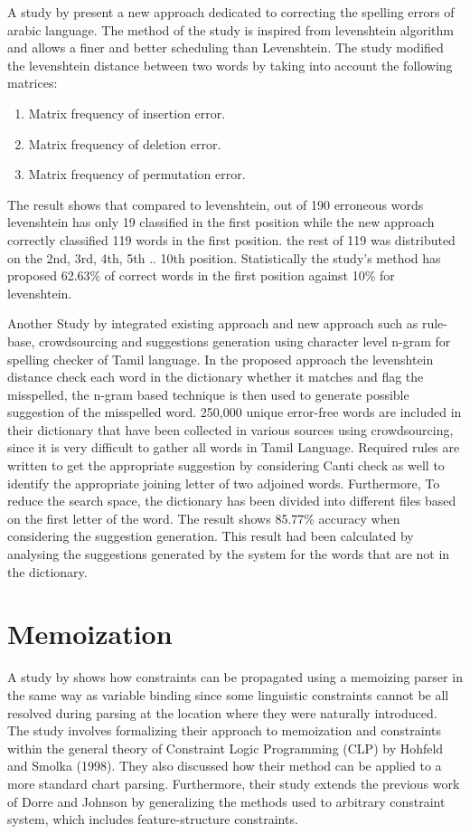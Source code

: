 \documentclass[12pt]{book}
\begin{document}
A study by \cite{hicham2012introduction} present a new approach dedicated to correcting the spelling errors of arabic language. The method of the study is inspired from levenshtein algorithm and allows a finer and better scheduling than Levenshtein. The study modified the levenshtein distance between two words by taking into account the following matrices: 

\begin{enumerate}
	\item Matrix frequency of insertion error.
	\item Matrix frequency of deletion error.
	\item Matrix frequency of permutation error.
\end{enumerate}

The result shows that compared to levenshtein, out of 190 erroneous words levenshtein  has only 19 classified in the first position while the new approach correctly classified 119 words in the first position. the rest of 119 was distributed on the 2nd, 3rd, 4th, 5th .. 10th position. Statistically the study’s method has proposed 62.63\% of correct words  in the first position against 10\% for levenshtein. 

Another Study by \cite{sarveswaran2015hierarchical} integrated existing approach and new approach such as rule-base, crowdsourcing and suggestions generation using character level n-gram for spelling checker of Tamil language. In the proposed approach the levenshtein distance check each word in the dictionary whether it matches and flag the misspelled, the n-gram based technique is then used to generate possible suggestion of the misspelled word.  250,000 unique error-free words  are included in their dictionary that have been collected in various sources using crowdsourcing, since it is very difficult to gather all words in Tamil Language. Required rules are written to get the appropriate suggestion by considering Canti check as well to identify the appropriate joining letter of two adjoined words. Furthermore, To reduce the search space, the dictionary  has been divided into different files based on the first letter of the word.  The result shows 85.77\% accuracy when considering the suggestion generation. This result had been calculated by analysing the suggestions generated by the system for the words that are not in the dictionary.

\section{Memoization}
A study by \cite{johnson1995memoization} shows how constraints can be propagated using a memoizing parser in the same way as variable binding since some linguistic constraints cannot be all resolved during parsing at the location where they were naturally introduced. The study involves formalizing their approach to memoization and constraints within the general theory of Constraint Logic Programming (CLP) by Hohfeld and Smolka (1998). They also discussed how their method can be applied to a more standard chart parsing. Furthermore, their study extends the previous work of Dorre and Johnson by generalizing the methods used to arbitrary constraint system, which includes feature-structure constraints.
\end{document}
